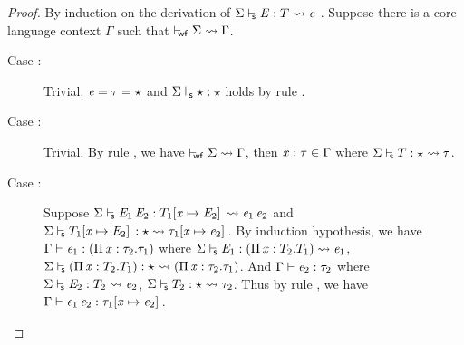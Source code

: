 \begin{proof}
    By induction on the derivation of $ \Sigma  \vdash_{\!\!\mathsf{s} }  \mathit{E}  :  T   \rightsquigarrow   \mathit{e} $ . Suppose there is a core language context $\Gamma$ such that $ \vdash_{\!\!\mathsf{wf} }  \Sigma   \rightsquigarrow   \Gamma $.
    \begin{description}
        \item[Case :] Trivial. $\mathit{e} = \tau = \star$ and $ \Sigma  \vdash_{\!\!\mathsf{s} }  \star  :  \star $ holds by rule .
        \item[Case :] Trivial. By rule , we have $ \vdash_{\!\!\mathsf{wf} }  \Sigma   \rightsquigarrow   \Gamma $, then $\mathit{x}:\tau  \in  \Gamma$ where $ \Sigma  \vdash_{\!\!\mathsf{s} }  T  :  \star   \rightsquigarrow   \tau $.
        \item[Case :] Suppose $ \Sigma  \vdash_{\!\!\mathsf{s} }  \mathit{E_{{\mathrm{1}}}} \, \mathit{E_{{\mathrm{2}}}}  :  T_{{\mathrm{1}}}  [  \mathit{x}  \mapsto  \mathit{E_{{\mathrm{2}}}}  ] \,   \rightsquigarrow   \mathit{e_{{\mathrm{1}}}} \, \mathit{e_{{\mathrm{2}}}} $ and $ \Sigma  \vdash_{\!\!\mathsf{s} }  T_{{\mathrm{1}}}  [  \mathit{x}  \mapsto  \mathit{E_{{\mathrm{2}}}}  ] \,  :  \star   \rightsquigarrow   \tau_{{\mathrm{1}}}  [  \mathit{x}  \mapsto  \mathit{e_{{\mathrm{2}}}}  ] \, $. By induction hypothesis, we have $\Gamma  \vdash  \mathit{e_{{\mathrm{1}}}}  :  (  \Pi \, \mathit{x}  :  \tau_{{\mathrm{2}}}  .  \tau_{{\mathrm{1}}}  )$ where $ \Sigma  \vdash_{\!\!\mathsf{s} }  \mathit{E_{{\mathrm{1}}}}  :  (  \Pi \, \mathit{x}  :  T_{{\mathrm{2}}}  .  T_{{\mathrm{1}}}  )   \rightsquigarrow   \mathit{e_{{\mathrm{1}}}} $, $ \Sigma  \vdash_{\!\!\mathsf{s} }  (  \Pi \, \mathit{x}  :  T_{{\mathrm{2}}}  .  T_{{\mathrm{1}}}  )  :  \star   \rightsquigarrow   (  \Pi \, \mathit{x}  :  \tau_{{\mathrm{2}}}  .  \tau_{{\mathrm{1}}}  ) $. And $\Gamma  \vdash  \mathit{e_{{\mathrm{2}}}}  :  \tau_{{\mathrm{2}}}$ where $ \Sigma  \vdash_{\!\!\mathsf{s} }  \mathit{E_{{\mathrm{2}}}}  :  T_{{\mathrm{2}}}   \rightsquigarrow   \mathit{e_{{\mathrm{2}}}} $, $ \Sigma  \vdash_{\!\!\mathsf{s} }  T_{{\mathrm{2}}}  :  \star   \rightsquigarrow   \tau_{{\mathrm{2}}} $. Thus by rule , we have $\Gamma  \vdash  \mathit{e_{{\mathrm{1}}}} \, \mathit{e_{{\mathrm{2}}}}  :  \tau_{{\mathrm{1}}}  [  \mathit{x}  \mapsto  \mathit{e_{{\mathrm{2}}}}  ] \,$.

\end{description}
\end{proof}
